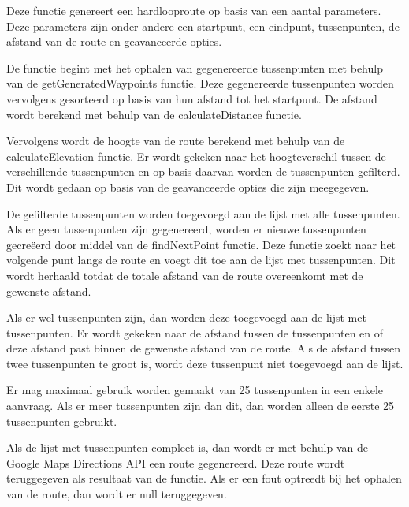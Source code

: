 


Deze functie genereert een hardlooproute op basis van een aantal parameters. Deze parameters zijn onder andere een startpunt, een eindpunt, tussenpunten, de afstand van de route en geavanceerde opties.

De functie begint met het ophalen van gegenereerde tussenpunten met behulp van de getGeneratedWaypoints functie. Deze gegenereerde tussenpunten worden vervolgens gesorteerd op basis van hun afstand tot het startpunt. De afstand wordt berekend met behulp van de calculateDistance functie.

Vervolgens wordt de hoogte van de route berekend met behulp van de calculateElevation functie. Er wordt gekeken naar het hoogteverschil tussen de verschillende tussenpunten en op basis daarvan worden de tussenpunten gefilterd. Dit wordt gedaan op basis van de geavanceerde opties die zijn meegegeven.

De gefilterde tussenpunten worden toegevoegd aan de lijst met alle tussenpunten. Als er geen tussenpunten zijn gegenereerd, worden er nieuwe tussenpunten gecreëerd door middel van de findNextPoint functie. Deze functie zoekt naar het volgende punt langs de route en voegt dit toe aan de lijst met tussenpunten. Dit wordt herhaald totdat de totale afstand van de route overeenkomt met de gewenste afstand.

Als er wel tussenpunten zijn, dan worden deze toegevoegd aan de lijst met tussenpunten. Er wordt gekeken naar de afstand tussen de tussenpunten en of deze afstand past binnen de gewenste afstand van de route. Als de afstand tussen twee tussenpunten te groot is, wordt deze tussenpunt niet toegevoegd aan de lijst.

Er mag maximaal gebruik worden gemaakt van 25 tussenpunten in een enkele aanvraag. Als er meer tussenpunten zijn dan dit, dan worden alleen de eerste 25 tussenpunten gebruikt.

Als de lijst met tussenpunten compleet is, dan wordt er met behulp van de Google Maps Directions API een route gegenereerd. Deze route wordt teruggegeven als resultaat van de functie. Als er een fout optreedt bij het ophalen van de route, dan wordt er null teruggegeven.